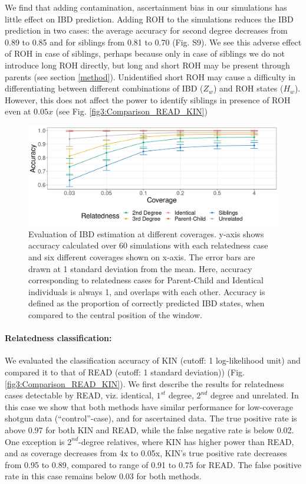 \documentclass[12pt, letterpaper]{article}
\begin{document}
We find that adding contamination, ascertainment bias in our simulations has little effect on IBD prediction. Adding ROH to the simulations reduces the IBD prediction in two cases: the average accuracy for second degree decreases from 0.89 to 0.85 and for siblings from 0.81 to 0.70 (Fig. S9). We see this adverse effect of ROH in case of siblings, perhaps because only in case of siblings we do not introduce long ROH directly, but long and short ROH may be present through parents (see section \ref{method}). Unidentified short ROH may cause a difficulty in differentiating between different combinations of IBD ($Z_w$) and ROH states ($H_w$). However, this does not affect the power to identify siblings in presence of ROH even at $0.05x$ (see Fig. \ref{fig3:Comparison_READ_KIN})


\begin{figure}[ht!]
    \includegraphics[width=16.5cm]{plots/plotimg/plot_IBDaccuracy.png}
    \centering
    \caption{Evaluation of IBD estimation at different coverages. y-axis shows accuracy calculated over 60 simulations with each relatedness case and six different coverages shown on x-axis. The error bars are drawn at 1 standard deviation from the mean. Here, accuracy corresponding to relatedness cases for Parent-Child and Identical individuals is always 1, and overlaps with each other. Accuracy is defined as the proportion of correctly predicted IBD states, when compared to the central position of the window.}
    \label{fig4:IBDstate_accuracy}
\end{figure}




\paragraph{Relatedness classification:}
We evaluated the classification accuracy of KIN (cutoff: 1 log-likelihood unit) and compared it to that of READ (cutoff: 1 standard deviation)) (Fig. \ref{fig3:Comparison_READ_KIN}). We first describe the results for relatedness cases detectable by READ, viz. identical, $1^{st}$ degree, $2^{nd}$ degree and unrelated. In this case we show that both methods have similar performance for low-coverage shotgun data (``control''-case), and for ascertained data. The true positive rate is above 0.97 for both KIN and READ, while the false negative rate is below 0.02. One exception is  $2^{nd}$-degree relatives, where KIN has higher power than READ, and as coverage decreases from 4x to 0.05x, KIN's true positive rate decreases from 0.95 to 0.89, compared to range of 0.91 to 0.75 for READ. The false positive rate in this case remains below 0.03 for both methods.
\end{document}
